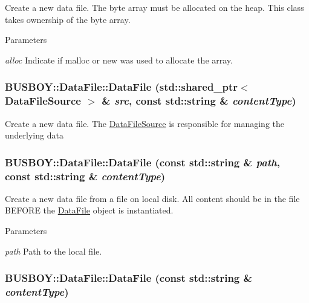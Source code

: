 Create a new data file. The byte array must be allocated on the heap. This class takes ownership of the byte array. 
\begin{DoxyParams}{Parameters}
\item[{\em alloc}]Indicate if malloc or new was used to allocate the array. \end{DoxyParams}
\hypertarget{classBUSBOY_1_1DataFile_a1dad37f234d3029bcab2cd9a9060827f}{
\subsubsection[{DataFile}]{\setlength{\rightskip}{0pt plus 5cm}BUSBOY::DataFile::DataFile (std::shared\_\-ptr$<$ {\bf DataFileSource} $>$ \& {\em src}, \/  const std::string \& {\em contentType})}}
\label{classBUSBOY_1_1DataFile_a1dad37f234d3029bcab2cd9a9060827f}


Create a new data file. The \hyperlink{classBUSBOY_1_1DataFileSource}{DataFileSource} is responsible for managing the underlying data \hypertarget{classBUSBOY_1_1DataFile_ade698e33f20a594f3bf954992c0b55f2}{
\subsubsection[{DataFile}]{\setlength{\rightskip}{0pt plus 5cm}BUSBOY::DataFile::DataFile (const std::string \& {\em path}, \/  const std::string \& {\em contentType})}}
\label{classBUSBOY_1_1DataFile_ade698e33f20a594f3bf954992c0b55f2}


Create a new data file from a file on local disk. All content should be in the file BEFORE the \hyperlink{classBUSBOY_1_1DataFile}{DataFile} object is instantiated. 
\begin{DoxyParams}{Parameters}
\item[{\em path}]Path to the local file. \end{DoxyParams}
\hypertarget{classBUSBOY_1_1DataFile_a617078d4b703345b0c18b179423316bd}{
\subsubsection[{DataFile}]{\setlength{\rightskip}{0pt plus 5cm}BUSBOY::DataFile::DataFile (const std::string \& {\em contentType})}}
\label{classBUSBOY_1_1DataFile_a617078d4b703345b0c18b179423316bd}


